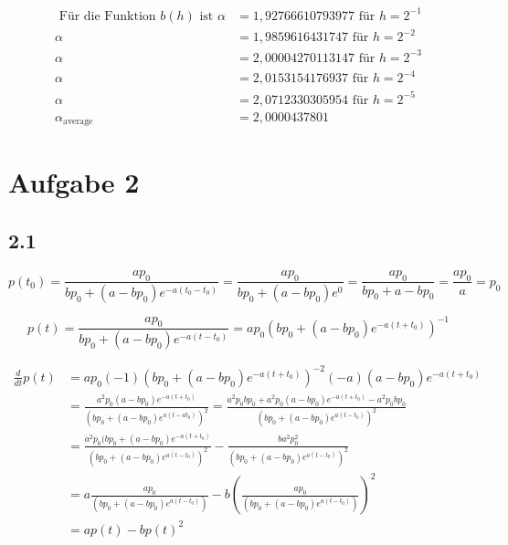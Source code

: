 \documentclass[10pt,oneside,a4paper]{scrartcl}
\begin{document}
	\begin{align*}
 		\text{ Für die Funktion } b(h) \text { ist } \alpha &= 1,92766610793977 \text { für } h = 2^{-1} \\
		\alpha &= 1,9859616431747 \text { für } h = 2^{-2} \\
		\alpha &= 2,00004270113147 \text { für } h = 2^{-3} \\
		\alpha &= 2,0153154176937 \text { für } h = 2^{-4} \\
		\alpha &= 2,0712330305954 \text { für } h = 2^{-5} \\
		\alpha_{\text{average}} &= 2,0000437801
 	\end{align*}

	\section*{Aufgabe 2}

	\subsection*{2.1}

	\begin{equation*}	
		p(t_{0}) =\frac {ap_0} {bp_0+ (a-bp_0)e^{-a(t_{0}-t_0)} } = 
				\frac {ap_0} {bp_0+ (a-bp_0)e^0 } = 
				\frac {ap_0} {bp_0+ a-bp_0} =
				\frac {ap_0} {a } = p_0 
	\end{equation*}

	\begin{equation*}
		p(t)  =\frac {ap_0} {bp_0+ (a-bp_0)e^{-a(t-t_0)} } =
			 ap_{0} (bp_0+ (a-bp_0)e^{-a(t + t_0) })^{-1} 
	\end{equation*}

	\begin{align*}
		\frac{d}{dt}p(t) & =
			 ap_{0}(-1) (bp_0+( a -bp_0)e^{-a(t + t_0) })^{-2}
			 (- a)(a-bp_0)e^{-a(t + t_0) }\\
			 & =\frac {a^{2}p_0(a-bp_0)e^{-a(t + t_0)}} {(bp_0+( a -bp_0)e^{a(t 				- at_0) })^{2}}
			 =\frac {a^{2}p_0bp_0 + a^{2}p_0(a-bp_0)e^{-a(t + t_0)} - 		 			a^{2}p_0bp_0} {(bp_0+( a -bp_0)e^{a(t- t_0) })^{2}}\\
			& = \frac {a^{2}p_0(bp_0 + (a-bp_0)e^{-a(t + t_0)}}
			 {(bp_0+( a -bp_0)e^{a(t- t_0) })^{2}} - 
				\frac {ba^{2}p_{0}^2} {(bp_0+( a -bp_0)e^{a(t- t_0) })^{2}}\\
			& =a \frac {ap_0} {(bp_0+( a -bp_0)e^{a(t- t_0) })} - 
				b\left(\frac {ap_{0}} {(bp_0+( a -bp_0)e^{a(t- t_0) })}\right)^2\\
			& = ap(t)-bp(t)^2
	\end{align*}
\end{document}
